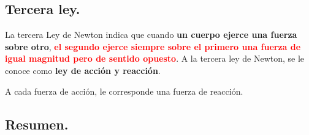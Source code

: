 \documentclass[14pt]{extarticle}
\newcommand{\textocolor}[2]{\textbf{\textcolor{#1}{#2}}}
\begin{document}



\subsection{Tercera ley.}

La tercera Ley de Newton indica que cuando \textocolor{denim}{un cuerpo ejerce una fuerza sobre otro}, \textocolor{red}{el segundo ejerce siempre sobre el primero una fuerza de igual magnitud pero de sentido opuesto}. A la tercera ley de Newton, se le conoce como \textocolor{auburn}{ley de acción y reacción}.

A cada fuerza de acción, le corresponde una fuerza de reacción.

\subsection*{Resumen.}
\end{document}
